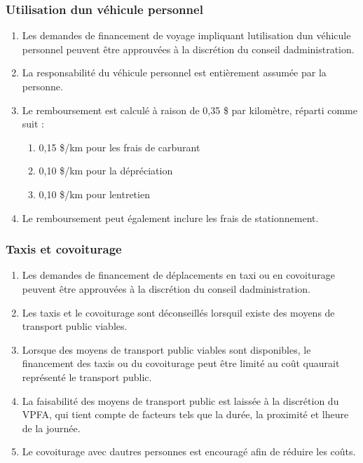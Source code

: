 \subsubsection{Utilisation d\textquotesingle un véhicule personnel}
\label{utilisation-d-un-vehicule-personnel}

\begin{enumerate}
 \item
  Les demandes de financement de voyage impliquant l\textquotesingle utilisation d\textquotesingle un véhicule personnel peuvent être approuvées à la discrétion du conseil d\textquotesingle administration.
 \item
  La responsabilité du véhicule personnel est entièrement assumée par la personne.
 \item
  Le remboursement est calculé à raison de 0,35 \$ par kilomètre, réparti comme suit :

  \begin{enumerate}
   \item
    0,15 \$/km pour les frais de carburant
   \item
    0,10 \$/km pour la dépréciation
   \item
    0,10 \$/km pour l\textquotesingle entretien
  \end{enumerate}

 \item
  Le remboursement peut également inclure les frais de stationnement.
\end{enumerate}

\subsubsection{Taxis et covoiturage}
\label{taxis-et-covoiturage}

\begin{enumerate}
 \item
  Les demandes de financement de déplacements en taxi ou en covoiturage peuvent être approuvées à la discrétion du conseil d\textquotesingle administration.
 \item
  Les taxis et le covoiturage sont déconseillés lorsqu\textquotesingle il existe des moyens de transport public viables.
 \item
  Lorsque des moyens de transport public viables sont disponibles, le financement des taxis ou du covoiturage peut être limité au coût qu\textquotesingle aurait représenté le transport public.
 \item
  La faisabilité des moyens de transport public est laissée à la discrétion du VPFA, qui tient compte de facteurs tels que la durée, la proximité et l\textquotesingle heure de la journée.
 \item
  Le covoiturage avec d\textquotesingle autres personnes est encouragé afin de réduire les coûts.
\end{enumerate}

